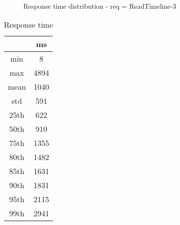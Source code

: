 \begin{minipage}{0.75\linewidth}
\begin{figure}[h]
\begin{adjustbox}{max width=1.0\linewidth, keepaspectratio}
  \end{adjustbox}
  \caption{Response time distribution - req = ReadTimeline-3}
\end{figure}
\end{minipage}\hfill\begin{minipage}{0.18\linewidth}
\begin{table}[h]
\begin{tabular}{|cc|}
\hline
\textbf{} & \textbf{ms}\\ \hline
 \Xhline{0.005\arrayrulewidth}
min & 8\\
 \Xhline{0.005\arrayrulewidth}
max & 4894\\
 \Xhline{0.005\arrayrulewidth}
mean & 1040\\
 \Xhline{0.005\arrayrulewidth}
std & 591\\
\hline
\hline
 \Xhline{0.005\arrayrulewidth}
25th & 622\\
 \Xhline{0.005\arrayrulewidth}
50th & 910\\
 \Xhline{0.005\arrayrulewidth}
75th & 1355\\
 \Xhline{0.005\arrayrulewidth}
80th & 1482\\
 \Xhline{0.005\arrayrulewidth}
85th & 1631\\
 \Xhline{0.005\arrayrulewidth}
90th & 1831\\
 \Xhline{0.005\arrayrulewidth}
95th & 2115\\
 \Xhline{0.005\arrayrulewidth}
99th & 2941\\
\hline
\end{tabular}
\caption{Response time}
\end{table}
\end{minipage}\hfill